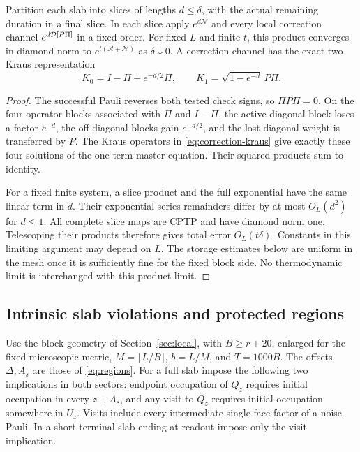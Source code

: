 \begin{lemma}\label{lem:product-general}
Partition each slab into slices of lengths \(d\le\delta\), with the
actual remaining duration in a final slice. In each slice apply
\(e^{d\mathcal N}\) and every local correction channel
\(e^{d\mathcal D[P\Pi]}\) in a fixed order.
For fixed \(L\) and finite \(t\), this product converges in diamond
norm to \(e^{t(\mathcal A+\mathcal N)}\) as \(\delta\downarrow0\).
A correction channel has the exact two-Kraus representation
\begin{equation}\label{eq:correction-kraus}
 K_0=I-\Pi+e^{-d/2}\Pi,\qquad
 K_1=\sqrt{1-e^{-d}}\,P\Pi .
\end{equation}
\end{lemma}
\begin{proof}
The successful Pauli reverses both tested check signs, so
\(\Pi P\Pi=0\). On the four operator blocks associated with
\(\Pi\) and \(I-\Pi\), the active diagonal block loses a factor
\(e^{-d}\), the off-diagonal blocks gain \(e^{-d/2}\), and the
lost diagonal weight is transferred by \(P\).
The Kraus operators in \eqref{eq:correction-kraus} give exactly
these four solutions of the one-term master equation.
Their squared products sum to identity.

For a fixed finite system, a slice product and the full
exponential have the same linear term in \(d\). Their exponential
series remainders differ by at most \(O_L(d^2)\) for \(d\le1\).
All complete slice maps are CPTP and have diamond norm one.
Telescoping their products therefore gives total error
\(O_L(t\delta)\). Constants in this limiting argument may
depend on \(L\). The storage estimates below are uniform in
the mesh once it is sufficiently fine for the fixed block side.
No thermodynamic limit is interchanged with this product limit.
\end{proof}

\subsection{Intrinsic slab violations and protected regions}

Use the block geometry of Section~\ref{sec:local}, with
\(B\ge r+20\), enlarged for the fixed microscopic metric,
\(M=\lfloor L/B\rfloor\), \(b=L/M\), and \(T=1000B\).
The offsets \(\Delta,A_s\) are those of \eqref{eq:regions}.
For a full slab impose the following two implications in both
sectors: endpoint occupation of \(Q_z\) requires initial occupation
in every \(z+A_s\), and any visit to \(Q_z\) requires initial
occupation somewhere in \(U_z\). Visits include every intermediate
single-face factor of a noise Pauli. In a short terminal slab ending
at readout impose only the visit implication.

